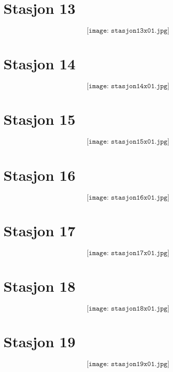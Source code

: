 \section{Stasjon 13}

$$\texttt{[image: stasjon13x01.jpg]}$$


\section{Stasjon 14}

$$\texttt{[image: stasjon14x01.jpg]}$$


\section{Stasjon 15}

$$\texttt{[image: stasjon15x01.jpg]}$$


\section{Stasjon 16}

$$\texttt{[image: stasjon16x01.jpg]}$$


\section{Stasjon 17}

$$\texttt{[image: stasjon17x01.jpg]}$$


\section{Stasjon 18}

$$\texttt{[image: stasjon18x01.jpg]}$$


\section{Stasjon 19}

$$\texttt{[image: stasjon19x01.jpg]}$$














































